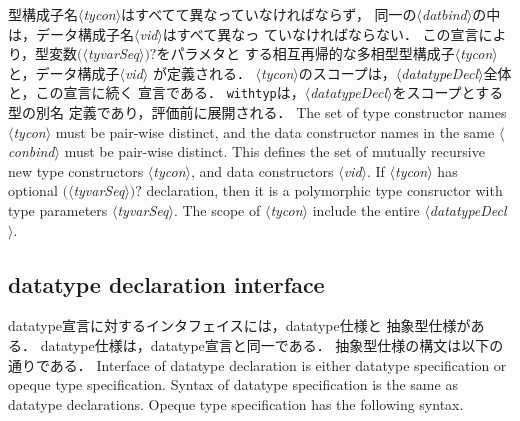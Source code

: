 \documentclass{jbook}
\newcommand{\txt}[2]{#2}
\newcommand{\nonterm}[1]{\mbox{$\langle$}{\it #1}\mbox{$\rangle$}}
\newcommand{\term}[1]{\mbox{{\tt #1}}}
\newcommand{\optional}[1]{\mbox{$($}{\protect #1}\mbox{$)?$}}
\begin{document}
\ifjp%
	型構成子名\nonterm{tycon}はすべてて異なっていなければならず，
同一の\nonterm{datbind}の中は，データ構成子名\nonterm{vid}はすべて異なっ
ていなければならない．
	この宣言により，型変数\optional{\nonterm{tyvarSeq}}をパラメタと
する相互再帰的な多相型型構成子\nonterm{tycon}と，データ構成子\nonterm{vid}
が定義される．
	\nonterm{tycon}のスコープは，\nonterm{datatypeDecl}全体と，この宣言に続く
宣言である．
	\term{withtyp}は，\nonterm{datatypeDecl}をスコープとする型の別名
定義であり，評価前に展開される．
\else%
	The set of type constructor names \nonterm{tycon} must be
pair-wise distinct, and the data constructor names in the same
\nonterm{conbind} must be pair-wise distinct.
	This defines the set of mutually recursive new type constructors 
\nonterm{tycon}, and data constructors \nonterm{vid}.
	If \nonterm{tycon} has optional \optional{\nonterm{tyvarSeq}}
declaration, then it is a polymorphic type consructor with type
parameters \nonterm{tyvarSeq}.
	The scope of \nonterm{tycon} include the entire
\nonterm{datatypeDecl}.
\fi%
	

\subsection{\txt{datatype宣言インタフェース}{datatype declaration interface}}
\ifjp%
	datatype宣言に対するインタフェイスには，datatype仕様と
抽象型仕様がある．
	datatype仕様は，datatype宣言と同一である．
	抽象型仕様の構文は以下の通りである．
\else%
	Interface of datatype declaration is either
datatype specification or opeque type specification.
	Syntax of datatype specification is the same as
datatype declarations.
	Opeque type specification has the following syntax.
\fi%
\end{document}
